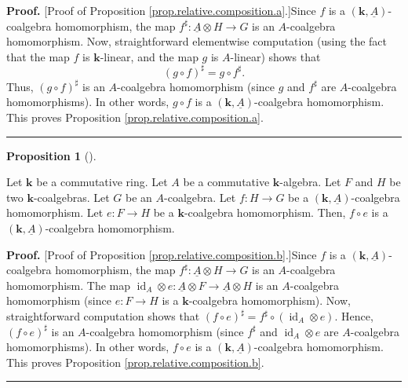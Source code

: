 \documentclass[numbers=enddot,12pt,final,onecolumn,notitlepage,abstracton]{scrartcl}%
\theoremstyle{definition}
\newtheorem{prop}[theo]{Proposition}
\newenvironment{proposition}[1][]
{\begin{prop}[#1]\begin{leftbar}}
{\end{leftbar}\end{prop}}
\newenvironment{proof}[1][Proof]{\noindent\textbf{#1.} }{\ \rule{0.5em}{0.5em}}
\begin{document}
\begin{proof}
[Proof of Proposition \ref{prop.relative.composition.a}.]Since $f$ is a
$\left(  \mathbf{k},\underline{A}\right)  $-coalgebra homomorphism, the map
$f^{\sharp}:\underline{A}\otimes H\rightarrow G$ is an $A$-coalgebra
homomorphism. Now, straightforward elementwise computation (using the fact
that the map $f$ is $\mathbf{k}$-linear, and the map $g$ is $A$-linear) shows
that
\begin{equation}
\left(  g\circ f\right)  ^{\sharp}=g\circ f^{\sharp}.
\label{pf.prop.relative.composition.a.1}%
\end{equation}
Thus, $\left(  g\circ f\right)  ^{\sharp}$ is an $A$-coalgebra homomorphism
(since $g$ and $f^{\sharp}$ are $A$-coalgebra homomorphisms). In other words,
$g\circ f$ is a $\left(  \mathbf{k},\underline{A}\right)  $-coalgebra
homomorphism. This proves Proposition \ref{prop.relative.composition.a}.
\end{proof}

\begin{proposition}
\label{prop.relative.composition.b}Let $\mathbf{k}$ be a commutative ring. Let
$A$ be a commutative $\mathbf{k}$-algebra. Let $F$ and $H$ be two $\mathbf{k}%
$-coalgebras. Let $G$ be an $A$-coalgebra. Let $f:H\rightarrow G$ be a
$\left(  \mathbf{k},\underline{A}\right)  $-coalgebra homomorphism. Let
$e:F\rightarrow H$ be a $\mathbf{k}$-coalgebra homomorphism. Then, $f\circ e$
is a $\left(  \mathbf{k},\underline{A}\right)  $-coalgebra homomorphism.
\end{proposition}

\begin{proof}
[Proof of Proposition \ref{prop.relative.composition.b}.]Since $f$ is a
$\left(  \mathbf{k},\underline{A}\right)  $-coalgebra homomorphism, the map
$f^{\sharp}:\underline{A}\otimes H\rightarrow G$ is an $A$-coalgebra
homomorphism. The map $\operatorname*{id}\nolimits_{A}\otimes e:\underline{A}%
\otimes F\rightarrow\underline{A}\otimes H$ is an $A$-coalgebra homomorphism
(since $e:F\rightarrow H$ is a $\mathbf{k}$-coalgebra homomorphism). Now,
straightforward computation shows that $\left(  f\circ e\right)  ^{\sharp
}=f^{\sharp}\circ\left(  \operatorname*{id}\nolimits_{A}\otimes e\right)  $.
Hence, $\left(  f\circ e\right)  ^{\sharp}$ is an $A$-coalgebra homomorphism
(since $f^{\sharp}$ and $\operatorname*{id}\nolimits_{A}\otimes e$ are
$A$-coalgebra homomorphisms). In other words, $f\circ e$ is a $\left(
\mathbf{k},\underline{A}\right)  $-coalgebra homomorphism. This proves
Proposition \ref{prop.relative.composition.b}.
\end{proof}
\end{document}
